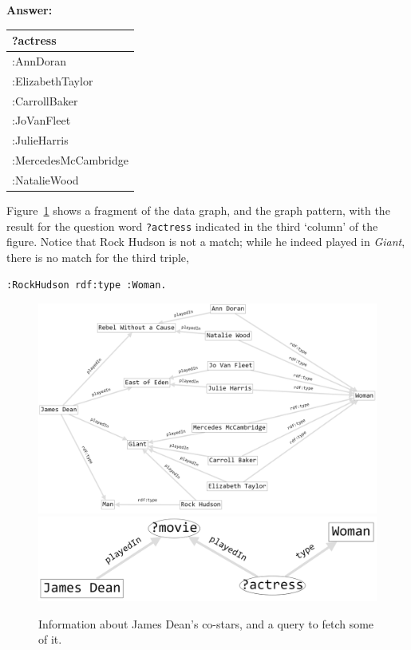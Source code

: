 \textbf{\textbf{Answer:}}

\begin{tabular}{|l|}
\hline
?actress\\
\hline
:AnnDoran\\
:ElizabethTaylor\\
:CarrollBaker\\
:JoVanFleet\\
:JulieHarris\\
:MercedesMcCambridge\\
:NatalieWood\\
\hline
\end{tabular}

Figure~\ref{fig:ch6.4} shows a fragment of the data graph, and the graph pattern,
with the result for the question word \texttt{?actress} indicated in the third
`column' of the figure. Notice that Rock Hudson is not a match; while he
indeed played in \emph{Giant}, there is no match for the third triple,

\begin{lstlisting}
:RockHudson rdf:type :Woman.
\end{lstlisting}

\begin{figure}
\centering
\includegraphics[width=5in]{SWWOv3/media/ch6/figure6-4a.png}
\includegraphics[width=5in]{SWWOv3/media/ch6/figure6-4b.png}
\caption{Information about James Dean's co-stars, and a query to fetch some of it.}
\label{fig:ch6.4}
\end{figure}

